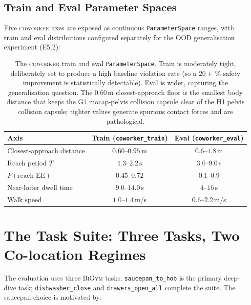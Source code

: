 \documentclass[11pt,a4paper]{report}
\newcommand{\bigym}{\textsc{BiGym}}
\newcommand{\coworker}{\textsc{coworker}}
\begin{document}
\subsection{Train and Eval Parameter Spaces}
\label{sec:bench:coworker:params}

Five \coworker{} axes are exposed as continuous
\texttt{ParameterSpace} ranges, with train and eval distributions
configured separately for the OOD generalisation experiment (E5.2):

\begin{table}[htbp]
\centering
\small
\caption{The \coworker{} train and eval \texttt{ParameterSpace}.
Train is moderately tight, deliberately set to produce a high
baseline violation rate (so a $20+\,\%$ safety improvement is
statistically detectable). Eval is wider, capturing the
generalisation question. The 0.60\,m closest-approach floor is the
smallest body distance that keeps the G1 mocap-pelvis collision
capsule clear of the H1 pelvis collision capsule; tighter values
generate spurious contact forces and are pathological.}
\label{tab:coworker-params}
\begin{tabular}{lcc}
\toprule
Axis & Train (\texttt{coworker\_train}) & Eval (\texttt{coworker\_eval}) \\
\midrule
Closest-approach distance     & $0.60$--$0.95$\,m  & $0.6$--$1.8$\,m  \\
Reach period $T$              & $1.3$--$2.2$\,s    & $3.0$--$9.0$\,s  \\
$P(\text{reach EE})$          & $0.45$--$0.72$     & $0.1$--$0.9$     \\
Near-loiter dwell time        & $9.0$--$14.0$\,s   & $4$--$16$\,s     \\
Walk speed                    & $1.0$--$1.4$\,m/s  & $0.6$--$2.2$\,m/s\\
\bottomrule
\end{tabular}
\end{table}

\section{The Task Suite: Three Tasks, Two Co-location Regimes}
\label{sec:bench:task}

The evaluation uses three \bigym{} tasks. \texttt{saucepan\_to\_hob}
is the primary deep-dive task; \texttt{dishwasher\_close} and
\texttt{drawers\_open\_all} complete the suite. The saucepan choice
is motivated by:
\end{document}
